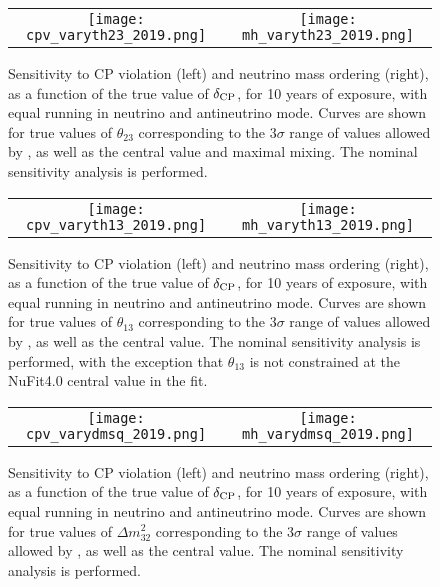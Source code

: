 \begin{figure}[h!]
    \centering
    \begin{tabular}{cc}
		\texttt{[image: cpv\_varyth23\_2019.png]} &
		\texttt{[image: mh\_varyth23\_2019.png]}
	\end{tabular}
	\caption[Sensitivity to CP violation and neutrino mass ordering, as a function of $\deltacp$]{Sensitivity to CP violation (left) and neutrino mass ordering (right), as a function of the true value of $\deltacp$, for 10 years of exposure, with equal running in neutrino and antineutrino mode. Curves are shown for true values of $\theta_{23}$ corresponding to the 3$\sigma$ range of values allowed by , as well as the  central value and maximal mixing. The nominal sensitivity analysis is performed.}
    \label{fig:th23var}
\end{figure}

\begin{figure}[h!]
    \centering
    \begin{tabular}{cc}
		\texttt{[image: cpv\_varyth13\_2019.png]} &
		\texttt{[image: mh\_varyth13\_2019.png]}
	\end{tabular}
	\caption[Sensitivity to CP violation and neutrino mass ordering, as a function of $\deltacp$]{Sensitivity to CP violation (left) and neutrino mass ordering (right), as a function of the true value of $\deltacp$, for 10 years of exposure, with equal running in neutrino and antineutrino mode. Curves are shown for true values of $\theta_{13}$ corresponding to the 3$\sigma$ range of values allowed by , as well as the  central value. The nominal sensitivity analysis is performed, with the exception that $\theta_{13}$ is not constrained at the NuFit4.0 central value in the fit.}
    \label{fig:th13var}
\end{figure}

\begin{figure}[h!]
    \centering
    \begin{tabular}{cc}
		\texttt{[image: cpv\_varydmsq\_2019.png]} &
		\texttt{[image: mh\_varydmsq\_2019.png]}
	\end{tabular}
	\caption[Sensitivity to CP violation and neutrino mass ordering, as a function of $\deltacp$]{Sensitivity to CP violation (left) and neutrino mass ordering (right), as a function of the true value of $\deltacp$, for 10 years of exposure, with equal running in neutrino and antineutrino mode. Curves are shown for true values of $\Delta m^2_{32}$ corresponding to the 3$\sigma$ range of values allowed by , as well as the  central value. The nominal sensitivity analysis is performed.}
    \label{fig:dmsqvar}
\end{figure}

